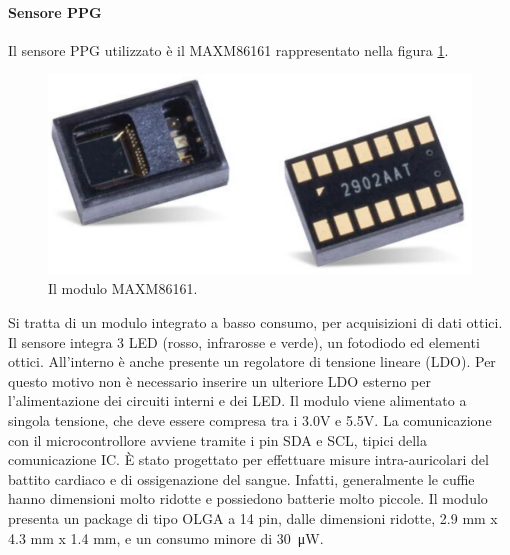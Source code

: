 \paragraph{Sensore PPG} Il sensore PPG utilizzato è il MAXM86161 rappresentato nella figura \ref{fig:ImmagineMAXM86161}.
\begin{figure}[tb]
	\centering
	\includegraphics[width=0.8\linewidth]{ImageFiles/Hardware/ImmagineMAXM86161}
	\caption{Il modulo MAXM86161.}
	\label{fig:ImmagineMAXM86161}
\end{figure}
Si tratta di un modulo integrato a basso consumo, per acquisizioni di dati ottici. Il sensore integra 3 LED (rosso, infrarosse e verde), un fotodiodo ed elementi ottici. All'interno è anche presente un regolatore di tensione lineare (LDO). Per questo motivo non è necessario inserire un ulteriore LDO esterno per l'alimentazione dei circuiti interni e dei LED. Il modulo viene alimentato a singola tensione, che deve essere compresa tra i 3.0V e 5.5V. %
La comunicazione con il microcontrollore avviene tramite i pin SDA e SCL, tipici della comunicazione IC. \`E stato progettato per effettuare misure intra-auricolari del battito cardiaco e di ossigenazione del sangue.  Infatti, generalmente le cuffie hanno dimensioni molto ridotte e possiedono batterie molto piccole. Il modulo presenta un package di tipo OLGA a 14 pin, dalle dimensioni ridotte, 2.9 mm x 4.3 mm x 1.4 mm, e un consumo minore di \SI{30}{\micro\watt}.

